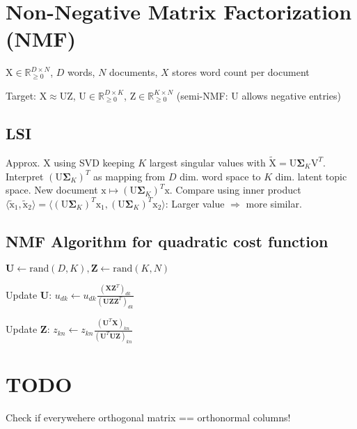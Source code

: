 \documentclass[a4paper, 11pt, landscape]{article}
\newcommand{\matr}[1]{\boldsymbol{\mathrm{#1}}}
\begin{document}
\begin{multicols*}{3}
\section{Non-Negative Matrix Factorization (NMF)}
\begin{inparaitem}
	\item $\matr{X} \in \mathbb{R}^{D \times N}_{\geq 0}$, $D$ words, $N$ documents, $X$ stores word count per document
	\item Target: $\matr{X} \approx \matr{UZ}$, $\matr{U} \in \mathbb{R}^{D \times K}_{\geq 0}$, $\matr{Z} \in \mathbb{R}^{K \times N}_{\geq 0}$ (semi-NMF: $\matr{U}$ allows negative entries)
\end{inparaitem}

\subsection{LSI}
Approx. $\matr{X}$ using SVD keeping $K$ largest singular values with $\tilde{\matr{X}} = \matr{U} \boldsymbol{\Sigma}_K \matr{V}^T$. Interpret $(\matr{U} \boldsymbol{\Sigma}_K)^T$ as mapping from $D$ dim. word space to $K$ dim. latent topic space. New document $\matr{x} \mapsto (\matr{U} \boldsymbol{\Sigma}_K)^T \matr{x}$. Compare using inner product $\langle \tilde{\matr{x}}_1, \tilde{\matr{x}}_2 \rangle = \langle (\matr{U} \boldsymbol{\Sigma}_K)^T \matr{x}_1, (\matr{U} \boldsymbol{\Sigma}_K)^T \matr{x}_2 \rangle$: Larger value $\Rightarrow$ more similar.

\subsection{NMF Algorithm for quadratic cost function}
\begin{compactitem}
\item $\mathbf{U} \gets \mathrm{rand}(D,K), \mathbf{Z} \gets \mathrm{rand}(K,N)$
\item Update $\mathbf{U}$: $u_{dk} \gets u_{dk} \frac{(\mathbf{X}\mathbf{Z}^T)_{dk}}{(\mathbf{U}\mathbf{Z}\mathbf{Z}^T)_{dk}}$
\item Update $\mathbf{Z}$: $z_{kn} \gets z_{kn} \frac{(\mathbf{U}^T\mathbf{X})_{kn}}{(\mathbf{U}^T\mathbf{U}\mathbf{Z})_{kn}}$
\end{compactitem}

\section{TODO}
Check if everywehere orthogonal matrix == orthonormal columns!



\raggedcolumns
\end{multicols*}
\end{document}
